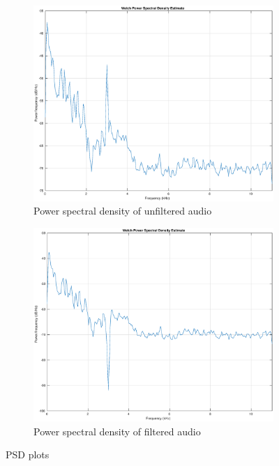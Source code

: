 \documentclass{article}
\begin{document}
\begin{figure}[H]
    \centering
    \begin{subfigure}[b]{0.45\textwidth}
        \centering
        \includegraphics[width=\textwidth]{audio_freq}
        \caption{Power spectral density of unfiltered audio}
        \label{fig:psd3}
    \end{subfigure}
    \hfill
    \begin{subfigure}[b]{0.45\textwidth}
        \centering
        \includegraphics[width=\textwidth]{audio_bsf}
        \caption{Power spectral density of filtered audio}
        \label{fig:psd4}
    \end{subfigure}
    \caption{PSD plots}
\end{figure}
\end{document}
